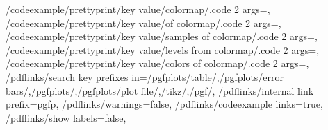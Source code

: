 {    %
    /codeexample/prettyprint/key value/colormap/.code 2 args={},
    /codeexample/prettyprint/key value/of colormap/.code 2 args={},
    /codeexample/prettyprint/key value/samples of colormap/.code 2 args={},
    /codeexample/prettyprint/key value/levels from colormap/.code 2 args={},
    /codeexample/prettyprint/key value/colors of colormap/.code 2 args={},
    /pdflinks/search key prefixes in={/pgfplots/table/,/pgfplots/error bars/,/pgfplots/,/pgfplots/plot file/,/tikz/,/pgf/},
    /pdflinks/internal link prefix=pgfp,
    /pdflinks/warnings=false,
    /pdflinks/codeexample links=true,
    /pdflinks/show labels=false,
}%


%
\def\declaretext#1{\texttt{\declare{#1}}}

%
\def\declarelabel#1{%
    \texttt{\declare{#1}}%
    \pgfmanualpdflabel{#1}{}%
}

\def\pgfmanualbar{\char`\|}
\makeatletter



%
\def\pgfplotsmanualenableexternalizationofexpensive{%
    \pgfplotsmanual@enable@externalization@for@expensivetrue
    \tikzexternalize[
        prefix=figures/expensiveexampleX,%
        figure name={},
        export=false, %
        mode=list and make,
        verbose=false,
    ]
    \tikzifexternalizing{%
        \nofiles
        \pgfkeys{/pdflinks/codeexample links=false}%
    }{}%
}%

